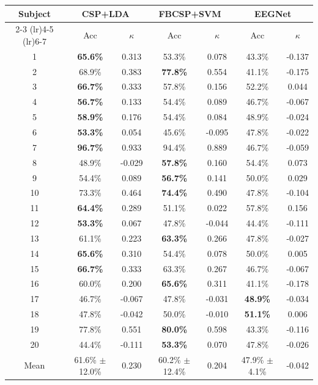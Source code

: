 \begin{tabular}{ccccccc}
\toprule
Subject & \multicolumn{2}{c}{CSP+LDA} & \multicolumn{2}{c}{FBCSP+SVM} & \multicolumn{2}{c}{EEGNet} \\
\cmidrule(lr){2-3} \cmidrule(lr){4-5} \cmidrule(lr){6-7}
 & Acc & $\kappa$ & Acc & $\kappa$ & Acc & $\kappa$ \\
\midrule
1 & \textbf{65.6\%} & 0.313 & 53.3\% & 0.078 & 43.3\% & -0.137 \\
2 & 68.9\% & 0.383 & \textbf{77.8\%} & 0.554 & 41.1\% & -0.175 \\
3 & \textbf{66.7\%} & 0.333 & 57.8\% & 0.156 & 52.2\% & 0.044 \\
4 & \textbf{56.7\%} & 0.133 & 54.4\% & 0.089 & 46.7\% & -0.067 \\
5 & \textbf{58.9\%} & 0.176 & 54.4\% & 0.084 & 48.9\% & -0.024 \\
6 & \textbf{53.3\%} & 0.054 & 45.6\% & -0.095 & 47.8\% & -0.022 \\
7 & \textbf{96.7\%} & 0.933 & 94.4\% & 0.889 & 46.7\% & -0.059 \\
8 & 48.9\% & -0.029 & \textbf{57.8\%} & 0.160 & 54.4\% & 0.073 \\
9 & 54.4\% & 0.089 & \textbf{56.7\%} & 0.141 & 50.0\% & 0.029 \\
10 & 73.3\% & 0.464 & \textbf{74.4\%} & 0.490 & 47.8\% & -0.104 \\
11 & \textbf{64.4\%} & 0.289 & 51.1\% & 0.022 & 57.8\% & 0.156 \\
12 & \textbf{53.3\%} & 0.067 & 47.8\% & -0.044 & 44.4\% & -0.111 \\
13 & 61.1\% & 0.223 & \textbf{63.3\%} & 0.266 & 47.8\% & -0.027 \\
14 & \textbf{65.6\%} & 0.310 & 54.4\% & 0.078 & 50.0\% & 0.005 \\
15 & \textbf{66.7\%} & 0.333 & 63.3\% & 0.267 & 46.7\% & -0.067 \\
16 & 60.0\% & 0.200 & \textbf{65.6\%} & 0.311 & 41.1\% & -0.178 \\
17 & 46.7\% & -0.067 & 47.8\% & -0.031 & \textbf{48.9\%} & -0.034 \\
18 & 47.8\% & -0.042 & 50.0\% & -0.010 & \textbf{51.1\%} & 0.006 \\
19 & 77.8\% & 0.551 & \textbf{80.0\%} & 0.598 & 43.3\% & -0.116 \\
20 & 44.4\% & -0.111 & \textbf{53.3\%} & 0.070 & 47.8\% & -0.026 \\
\midrule
Mean & 61.6\% $\pm$ 12.0\% & 0.230 & 60.2\% $\pm$ 12.4\% & 0.204 & 47.9\% $\pm$ 4.1\% & -0.042 \\
\bottomrule
\end{tabular}